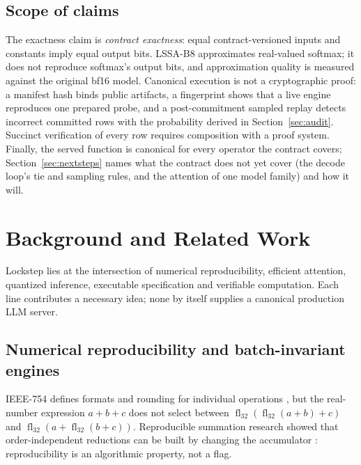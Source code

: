 \documentclass{article}
\newcommand{\fl}{\operatorname{fl}_{32}}
\begin{document}
\subsection{Scope of claims}

The exactness claim is \emph{contract exactness}: equal contract-versioned inputs and
constants imply equal output bits.  LSSA-B8 approximates real-valued softmax; it does not
reproduce softmax's output bits, and approximation quality is measured against the original
bf16 model.  Canonical execution is not a cryptographic proof: a manifest hash binds public
artifacts, a fingerprint shows that a live engine reproduces one prepared probe, and a
post-commitment sampled replay detects incorrect committed rows with the probability derived
in Section~\ref{sec:audit}.  Succinct verification of every row requires composition with a
proof system.  Finally, the served function is canonical for every operator the contract
covers; Section~\ref{sec:nextsteps} names what the contract does not yet cover (the decode
loop's tie and sampling rules, and the attention of one model family) and how it will.

\section{Background and Related Work}
\label{sec:background}

Lockstep lies at the intersection of numerical reproducibility, efficient attention,
quantized inference, executable specification and verifiable computation.  Each line
contributes a necessary idea; none by itself supplies a canonical production LLM server.

\subsection{Numerical reproducibility and batch-invariant engines}

IEEE-754 defines formats and rounding for individual operations
\cite{ieee754,goldberg1991floating}, but the real-number expression $a+b+c$ does not select
between $\fl(\fl(a+b)+c)$ and $\fl(a+\fl(b+c))$.  Reproducible summation research showed
that order-independent reductions can be built by changing the accumulator
\cite{demmel2013reproducible}: reproducibility is an algorithmic property, not a flag.
\end{document}
